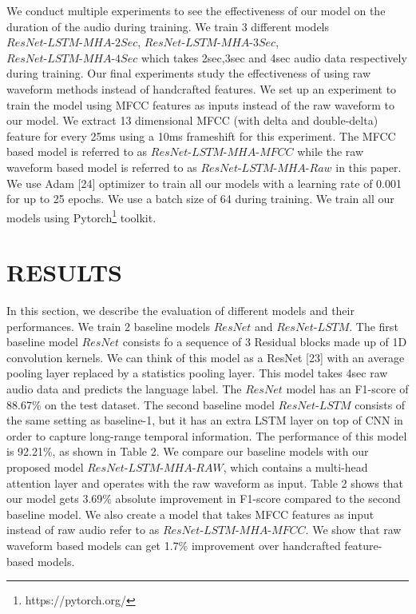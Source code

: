 \documentclass{article}
\begin{document}
We conduct multiple experiments to see the effectiveness of our model on the duration of the audio during training. We train 3 different models $\textit{ResNet-LSTM-MHA-2Sec}$, $\textit{ResNet-LSTM-MHA-3Sec}$, $\textit{ResNet-LSTM-MHA-4Sec}$ which takes 2sec,3sec and 4sec audio data respectively during training. Our final experiments study the effectiveness of using raw waveform methods instead of handcrafted features. We set up an experiment to train the model using MFCC features as inputs instead of the raw waveform to our model. We extract 13 dimensional MFCC (with delta and double-delta) feature for every 25ms using a 10ms frameshift for this experiment. The MFCC based model is referred to as $\textit{ResNet-LSTM-MHA-MFCC}$ while the raw waveform based model is referred to as $\textit{ResNet-LSTM-MHA-Raw}$ in this paper. We use Adam [24] optimizer to train all our models with a learning rate of 0.001 for up to 25 epochs. We use a batch size of 64 during training. We train all our models using Pytorch\footnote{https://pytorch.org/} toolkit.

\section{RESULTS}
\label{sec:illust}
In this section, we describe the evaluation of different models and their performances. We train 2 baseline models $\textit{ResNet}$ and $\textit{ResNet-LSTM}$. The first baseline model $\textit{ResNet}$ consists fo a sequence of 3 Residual blocks made up of 1D convolution kernels. We can think of this model as a ResNet [23] with an average pooling layer replaced by a statistics pooling layer. This model takes 4sec raw audio data and predicts the language label. The $\textit{ResNet}$ model has an F1-score of 88.67\% on the test dataset. The second baseline model $\textit{ResNet-LSTM}$ consists of the same setting as baseline-1, but it has an extra LSTM layer on top of CNN in order to capture long-range temporal information. The performance of this model is 92.21\%, as shown in Table 2. We compare our baseline models with our proposed model $\textit{ResNet-LSTM-MHA-RAW}$, which contains a multi-head attention layer and operates with the raw waveform as input. Table 2 shows that our model gets 3.69\% absolute improvement in F1-score compared to the second baseline model. We also create a model that takes MFCC features as input instead of raw audio refer to as  $\textit{ResNet-LSTM-MHA-MFCC}$. We show that raw waveform based models can get 1.7\% improvement over handcrafted feature-based models.
\end{document}
